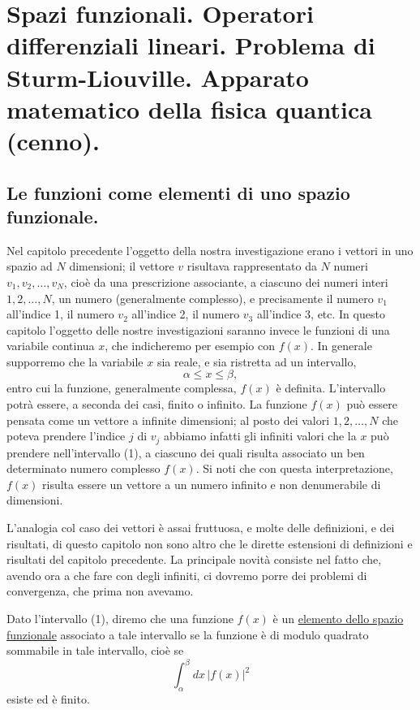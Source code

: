 \documentclass[11pt, a4paper]{book}
\numberwithin{equation}{section}
\begin{document}

\chapter[spazi funzionali, operatori diff. lineari, sturm-liouville]{Spazi funzionali. Operatori differenziali lineari.
Problema di Sturm-Liouville. Apparato matematico della fisica quantica
(cenno).}

\section{Le funzioni come elementi di uno spazio funzionale.}

Nel capitolo precedente l'oggetto della nostra investigazione erano i
vettori in uno spazio ad $N$ dimensioni; il vettore $v$ risultava
rappresentato da $N$ numeri $v_1, v_2, \ldots, v_N$, cioè da una
prescrizione associante, a ciascuno dei numeri interi $1,2,\ldots,N$,
un numero (generalmente complesso), e precisamente il numero $v_1$
all'indice 1, il numero $v_2$ all'indice 2, il numero $v_3$ all'indice
3, etc. In questo capitolo l'oggetto delle nostre investigazioni saranno
invece le funzioni di una variabile continua $x$, che indicheremo per
esempio con $f(x)$. In generale supporremo che la variabile $x$ sia
reale, e sia ristretta ad un intervallo,
\begin{equation}
\alpha \leq x \leq \beta,
\end{equation}
entro cui la funzione, generalmente complessa, $f(x)$ è definita.
L'intervallo potrà essere, a seconda dei casi, finito o infinito. La
funzione $f(x)$ può essere pensata come un vettore a infinite
dimensioni; al posto dei valori $1,2,\ldots,N$ che poteva prendere
l'indice $j$ di $v_j$ abbiamo infatti gli infiniti valori che la $x$
può prendere nell'intervallo (1), a ciascuno dei quali risulta associato
un ben determinato numero complesso $f(x)$. Si noti che con questa
interpretazione, $f(x)$ risulta essere un vettore a un numero infinito e
non denumerabile di dimensioni.

L'analogia col caso dei vettori è assai fruttuosa, e molte delle
definizioni, e dei risultati, di questo capitolo non sono altro che le
dirette estensioni di definizioni e risultati del capitolo precedente.
La principale novità consiste nel fatto che, avendo ora a che fare con
degli infiniti, ci dovremo porre dei problemi di convergenza, che prima
non avevamo.

Dato l'intervallo (1), diremo che una funzione $f(x)$ è un
\uline{elemento dello spazio funzionale} associato a tale intervallo
se la funzione è di modulo quadrato sommabile in tale intervallo, cioè
se
\[
\int_\alpha^\beta dx\,|f(x)|^2
\]
esiste ed è finito.
\end{document}
